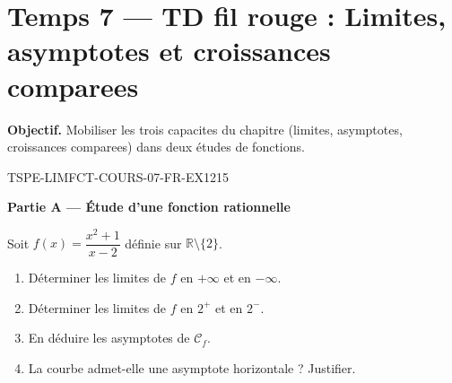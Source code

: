 
\section*{Temps 7 — TD fil rouge : Limites, asymptotes et croissances comparees}

\textbf{Objectif.} Mobiliser les trois capacites du chapitre (limites, asymptotes, croissances comparees) dans deux études de fonctions.

\bigskip


\begin{exercice}{TSPE-LIMFCT-COURS-07-FR-EX1}{2}{15}

\textbf{Partie A — Étude d'une fonction rationnelle}

Soit $f(x) = \dfrac{x^2 + 1}{x - 2}$ définie sur $\mathbb{R} \setminus \{2\}$.

\begin{enumerate}
  \item Déterminer les limites de $f$ en $+\infty$ et en $-\infty$.
  \item Déterminer les limites de $f$ en $2^+$ et en $2^-$.
  \item En déduire les asymptotes de $\mathcal{C}_f$.
  \item La courbe admet-elle une asymptote horizontale ? Justifier.
\end{enumerate}

\end{exercice}

